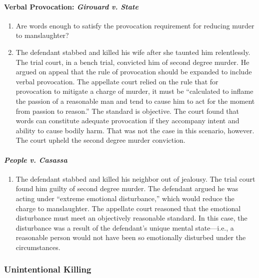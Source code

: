 \paragraph{Verbal Provocation: \emph{Girouard v. State}}

\begin{enumerate}
    \item Are words enough to satisfy the provocation requirement for reducing murder to manslaughter?
    \item The defendant stabbed and killed his wife after she taunted him relentlessly. The trial court, in a bench trial, convicted him of second degree murder. He argued on appeal that the rule of provocation should be expanded to include verbal provocation. The appellate court relied on the rule that for provocation to mitigate a charge of murder, it must be ``calculated to inflame the passion of a reasonable man and tend to cause him to act for the moment from passion to reason.'' The standard is objective. The court found that words can constitute adequate provocation if they accompany intent and ability to cause bodily harm. That was not the case in this scenario, however. The court upheld the second degree murder conviction.
\end{enumerate}

\paragraph{\emph{People v. Casassa}}

\begin{enumerate}
    \item The defendant stabbed and killed his neighbor out of jealousy. The trial court found him guilty of second degree murder. The defendant argued he was acting under ``extreme emotional disturbance,'' which would reduce the charge to manslaughter. The appellate court reasoned that the emotional disturbance must meet an objectively reasonable standard. In this case, the disturbance was a result of the defendant's unique mental state---i.e., a reasonable person would not have been so emotionally disturbed under the circumstances.
\end{enumerate}

\subsubsection{Unintentional Killing}

